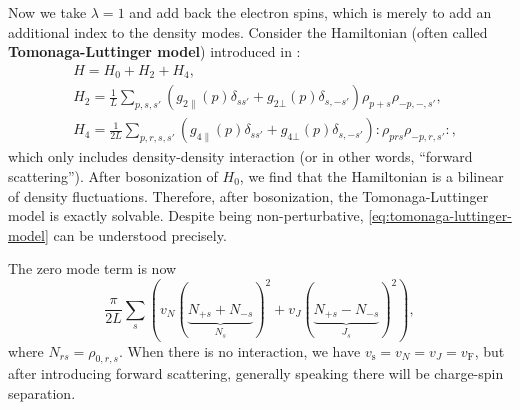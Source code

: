 \documentclass[hyperref, a4paper]{article}
\newcommand*{\normalorder}[1]{: #1 :}
\newcommand*{\concept}[1]{{\textbf{#1}}}
\begin{document}
Now we take $\lambda = 1$ and add back the electron spins, which is merely to add an additional index to the density modes.
Consider the Hamiltonian (often called \concept{Tomonaga-Luttinger model}) introduced in \cite{onedfermi1995}:
\begin{equation}
    \begin{aligned}
        & H = H_0 + H_2 + H_4,  \\
        & H_2 = \frac{1}{L} \sum_{p, s, s'} \left( g_{2 \parallel} (p) \delta_{s s'} + g_{2 \bot }(p) \delta_{s, -s'} \right) \rho_{p + s} \rho_{-p, -, s'}, \\
        & H_4 = \frac{1}{2L} \sum_{p, r, s, s'} \left( g_{4 \parallel} (p) \delta_{s s'} + g_{4 \bot }(p) \delta_{s, -s'} \right) \normalorder{\rho_{p r s} \rho_{-p, r, s'}},
    \end{aligned}
    \label{eq:tomonaga-luttinger-model}
\end{equation} 
which only includes density-density interaction (or in other words, ``forward scattering'').
After bosonization of $H_0$, we find that the Hamiltonian is a bilinear of density fluctuations.
Therefore, after bosonization, the Tomonaga-Luttinger model is exactly solvable.
Despite being non-perturbative, \eqref{eq:tomonaga-luttinger-model} can be understood precisely.

The zero mode term is now 
\begin{equation}
    \frac{\pi}{2L} \sum_s (v_N (\underbrace{N_{+ s} + N_{-s}}_{N_s})^2  + v_{J} (\underbrace{N_{+s} - N_{-s}}_{J_s})^2 ),
\end{equation}
where $N_{rs} = \rho_{0, r, s}$. When there is no interaction, we have $v_\text{s} = v_N = v_J = v_\text{F}$, but after 
introducing forward scattering, generally speaking there will be charge-spin separation.



\end{document}
